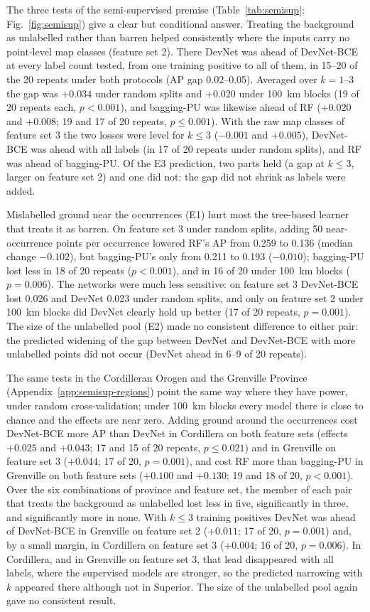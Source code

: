 \documentclass[pdflatex,sn-apa]{sn-jnl}
\begin{document}
The three tests of the semi-supervised premise (Table~\ref{tab:semisup}; Fig.~\ref{fig:semisup}) give a clear but conditional answer. Treating the background as unlabelled rather than barren helped consistently where the inputs carry no point-level map classes (feature set 2). There DevNet was ahead of DevNet-BCE at every label count tested, from one training positive to all of them, in 15--20 of the 20 repeats under both protocols (AP gap 0.02--0.05). Averaged over $k = 1$--3 the gap was $+0.034$ under random splits and $+0.020$ under 100~km blocks (19 of 20 repeats each, $p < 0.001$), and bagging-PU was likewise ahead of RF ($+0.020$ and $+0.008$; 19 and 17 of 20 repeats, $p \leq 0.001$). With the raw map classes of feature set 3 the two losses were level for $k \leq 3$ ($-0.001$ and $+0.005$), DevNet-BCE was ahead with all labels (in 17 of 20 repeats under random splits), and RF was ahead of bagging-PU. Of the E3 prediction, two parts held (a gap at $k \leq 3$, larger on feature set 2) and one did not: the gap did not shrink as labels were added.

Mislabelled ground near the occurrences (E1) hurt most the tree-based learner that treats it as barren. On feature set 3 under random splits, adding 50 near-occurrence points per occurrence lowered RF's AP from 0.259 to 0.136 (median change $-0.102$), but bagging-PU's only from 0.211 to 0.193 ($-0.010$); bagging-PU lost less in 18 of 20 repeats ($p < 0.001$), and in 16 of 20 under 100~km blocks ($p = 0.006$). The networks were much less sensitive: on feature set 3 DevNet-BCE lost 0.026 and DevNet 0.023 under random splits, and only on feature set 2 under 100~km blocks did DevNet clearly hold up better (17 of 20 repeats, $p = 0.001$). The size of the unlabelled pool (E2) made no consistent difference to either pair: the predicted widening of the gap between DevNet and DevNet-BCE with more unlabelled points did not occur (DevNet ahead in 6--9 of 20 repeats).

The same tests in the Cordilleran Orogen and the Grenville Province (Appendix~\ref{app:semisup-regions}) point the same way where they have power, under random cross-validation; under 100~km blocks every model there is close to chance and the effects are near zero. Adding ground around the occurrences cost DevNet-BCE more AP than DevNet in Cordillera on both feature sets (effects $+0.025$ and $+0.043$; 17 and 15 of 20 repeats, $p \leq 0.021$) and in Grenville on feature set 3 ($+0.044$; 17 of 20, $p = 0.001$), and cost RF more than bagging-PU in Grenville on both feature sets ($+0.100$ and $+0.130$; 19 and 18 of 20, $p < 0.001$). Over the six combinations of province and feature set, the member of each pair that treats the background as unlabelled lost less in five, significantly in three, and significantly more in none. With $k \leq 3$ training positives DevNet was ahead of DevNet-BCE in Grenville on feature set 2 ($+0.011$; 17 of 20, $p = 0.001$) and, by a small margin, in Cordillera on feature set 3 ($+0.004$; 16 of 20, $p = 0.006$). In Cordillera, and in Grenville on feature set 3, that lead disappeared with all labels, where the supervised models are stronger, so the predicted narrowing with $k$ appeared there although not in Superior. The size of the unlabelled pool again gave no consistent result.
\end{document}
